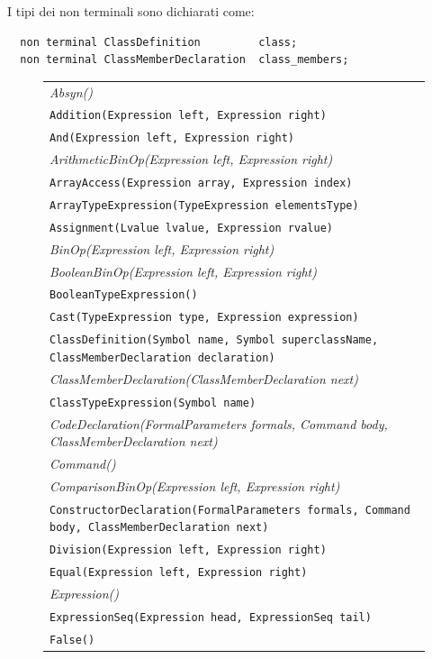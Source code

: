 I tipi dei non terminali sono dichiarati come:
%
\begin{verbatim}
  non terminal ClassDefinition         class;
  non terminal ClassMemberDeclaration  class_members;
\end{verbatim}
%
\begin{figure}
\begin{center}
{\scriptsize
\begin{tabular}{l}
\textit{Absyn()} \\
\texttt{Addition(Expression left, Expression right)} \\
\texttt{And(Expression left, Expression right)} \\
\textit{ArithmeticBinOp(Expression left, Expression right)} \\
\texttt{ArrayAccess(Expression array, Expression index)} \\
\texttt{ArrayTypeExpression(TypeExpression elementsType)} \\
\texttt{Assignment(Lvalue lvalue, Expression rvalue)} \\
\textit{BinOp(Expression left, Expression right)} \\
\textit{BooleanBinOp(Expression left, Expression right)} \\
\texttt{BooleanTypeExpression()} \\
\texttt{Cast(TypeExpression type, Expression expression)} \\
\texttt{ClassDefinition(Symbol name, Symbol superclassName, ClassMemberDeclaration declaration)} \\
\textit{ClassMemberDeclaration(ClassMemberDeclaration next)} \\
\texttt{ClassTypeExpression(Symbol name)} \\
\textit{CodeDeclaration(FormalParameters formals, Command body, ClassMemberDeclaration next)} \\
\textit{Command()} \\
\textit{ComparisonBinOp(Expression left, Expression right)} \\
\texttt{ConstructorDeclaration(FormalParameters formals, Command body, ClassMemberDeclaration next)} \\
\texttt{Division(Expression left, Expression right)} \\
\texttt{Equal(Expression left, Expression right)} \\
\textit{Expression()} \\
\texttt{ExpressionSeq(Expression head, ExpressionSeq tail)} \\
\texttt{False()} \\

\end{tabular}}
\end{center}
\end{figure}
